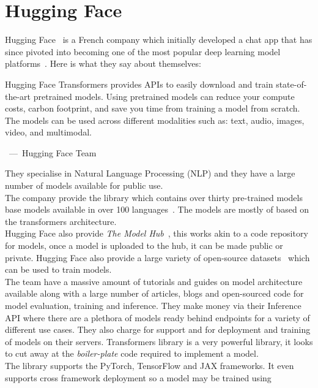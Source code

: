 \section{Hugging Face}
Hugging Face~\autocite{HuggingFaceAI} is a French company which initially developed a chat app that has since pivoted into becoming one of the most
popular deep learning model platforms~\autocite{syalHuggingFaceStep2020}. Here is what they say about themselves:
\begin{quoting} 
	Hugging Face Transformers provides APIs to easily download and train state-of-the-art pretrained models. Using pretrained models can reduce your compute
	costs, carbon footprint, and save you time from training a model from scratch. The models can be used across different modalities such as:
	text, audio, images, video, and multimodal.
	\begin{flushright}
	~---~Hugging Face Team
	\end{flushright}
\end{quoting}
They specialise in Natural Language Processing (NLP) and they have a large number of models available for public use.\\ 
The company provide the  library which contains over thirty pre-trained models base models available
in over 100 languages~\autocite{HuggingFaceTransformers}. The models are mostly of based on the transformers architecture.\\
Hugging Face also provide \emph{The Model Hub}~\autocite{ModelsHuggingFace}, this works akin to a code repository for models, once a model is uploaded to the hub, it can be 
made public or private. Hugging Face also provide a large variety of open-source datasets~\autocite{HuggingFaceAIa} which can be used to train models.\\
The team have a massive amount of tutorials and guides on model architecture available along with a large number of articles, blogs and open-sourced code for 
model evaluation, training and inference.
\bigbreak
They make money via their Inference API where there are a plethora of models ready behind endpoints for a variety of different use cases. 
They also charge for support and for deployment and training of models on their servers.
\bigbreak
Transformers library is a very powerful library, it looks to cut away at the \emph{boiler-plate} code required to implement a model.\\
The library supports the PyTorch, TensorFlow and JAX frameworks. It even supports cross framework deployment so a model may be trained using 
